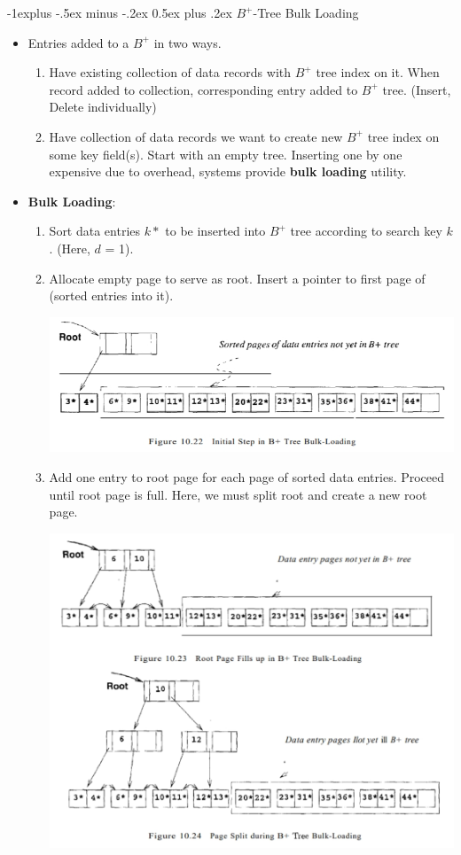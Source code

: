 \documentclass[10pt, landscape]{article}
\makeatletter
\renewcommand{\subsection}{\@startsection{subsection}{2}{0mm}%
                                {-1explus -.5ex minus -.2ex}%
                                {0.5ex plus .2ex}%
                                {\normalfont\normalsize\bfseries}}
\makeatother
\begin{document}
\begin{multicols*}{3}
\columnbreak

\subsection{$B^+$-Tree Bulk Loading}
\begin{itemize}
\item Entries added to a $B^+$ in two ways.
	\begin{enumerate}
	\item Have existing collection of data records with $B^+$ tree index on it. When record added to collection, corresponding entry added to $B^+$ tree. (Insert, Delete individually)
	\item Have collection of data records we want to create new $B^+$ tree index on some key field(s). Start with an empty tree. Inserting one by one expensive due to overhead, systems provide \textbf{bulk loading} utility.
	\end{enumerate}
\item \textbf{Bulk Loading}: 
	\begin{enumerate}
	\item Sort data entries $k*$ to be inserted into $B^+$ tree according to search key $k$. (Here, $d$ = 1).
	\item Allocate empty page to serve as root. Insert a pointer to first page of (sorted entries into it).
	\centerline{\includegraphics[width = 0.8\linewidth]{bulkloading1}}
	\item Add one entry to root page for each page of sorted data entries. Proceed until root page is full. Here, we must split root and create a new root page.
	\centerline{\includegraphics[width = 0.8\linewidth]{bulkloading2}}

\end{enumerate}
\end{itemize}
\end{multicols*}
\end{document}
